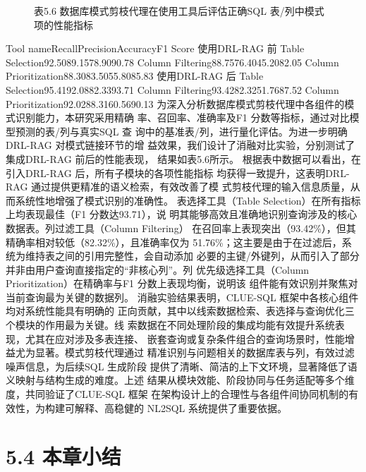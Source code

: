 \documentclass[12pt,a4paper,openright,UTF8]{ctexbook}
\begin{document}
\begin{figure}[htbp]
\centering
{}
\caption{表5.6 数据库模式剪枝代理在使用工具后评估正确SQL 表/列中模式项的性能指标}
\end{figure}

Tool nameRecallPrecisionAccuracyF1 Score 使用DRL-RAG 前 Table Selection92.5089.1578.9090.78 Column Filtering88.7576.4045.2082.05 Column Prioritization88.3083.5055.8085.83 使用DRL-RAG 后 Table Selection95.4192.0882.3393.71 Column Filtering93.4282.3251.7687.52 Column Prioritization92.0288.3160.5690.13 为深入分析数据库模式剪枝代理中各组件的模式识别能力，本研究采用精确 率、召回率、准确率及F1 分数等指标，通过对比模型预测的表/列与真实SQL 查 询中的基准表/列，进行量化评估。为进一步明确DRL-RAG 对模式链接环节的增 益效果，我们设计了消融对比实验，分别测试了集成DRL-RAG 前后的性能表现， 结果如表5.6所示。 根据表中数据可以看出，在引入DRL-RAG 后，所有子模块的各项性能指标 均获得一致提升，这表明DRL-RAG 通过提供更精准的语义检索，有效改善了模 式剪枝代理的输入信息质量，从而系统性地增强了模式识别的准确性。 表选择工具（Table Selection）在所有指标上均表现最佳（F1 分数达93.71），说 明其能够高效且准确地识别查询涉及的核心数据表。列过滤工具（Column Filtering） 在召回率上表现突出（93.42\%），但其精确率相对较低（82.32\%），且准确率仅为 51.76\%；这主要是由于在过滤后，系统为维持表之间的引用完整性，会自动添加 必要的主键/外键列，从而引入了部分并非由用户查询直接指定的“非核心列”。列 优先级选择工具（Column Prioritization）在精确率与F1 分数上表现均衡，说明该 组件能有效识别并聚焦对当前查询最为关键的数据列。 消融实验结果表明，CLUE-SQL 框架中各核心组件均对系统性能具有明确的 正向贡献，其中以线索数据检索、表选择与查询优化三个模块的作用最为关键。线 索数据在不同处理阶段的集成均能有效提升系统表现，尤其在应对涉及多表连接、 嵌套查询或复杂条件组合的查询场景时，性能增益尤为显著。模式剪枝代理通过 精准识别与问题相关的数据库表与列，有效过滤噪声信息，为后续SQL 生成阶段 提供了清晰、简洁的上下文环境，显著降低了语义映射与结构生成的难度。上述 结果从模块效能、阶段协同与任务适配等多个维度，共同验证了CLUE-SQL 框架 在架构设计上的合理性与各组件间协同机制的有效性，为构建可解释、高稳健的 NL2SQL 系统提供了重要依据。

\section{5.4 本章小结}
\end{document}
